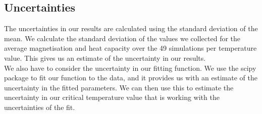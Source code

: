 \documentclass[twocolumn,a4paper,aps,amsmath,amssymb,floatfix,superscriptaddress]{revtex4-2}
\begin{document}
        \subsection{Uncertainties}
            The uncertainties in our results are calculated using the standard deviation of the mean. We calculate the standard deviation of the values we collected for the average magnetisation and heat capacity over the 49 simulations per temperature value. This gives us an estimate of the uncertainty in our results.\\
            We also have to consider the uncertainty in our fitting function. We use the scipy package to fit our function to the data, and it provides us with an estimate of the uncertainty in the fitted parameters. We can then use this to estimate the uncertainty in our critical temperature value that is working with the uncertainties of the fit.



\end{document}
